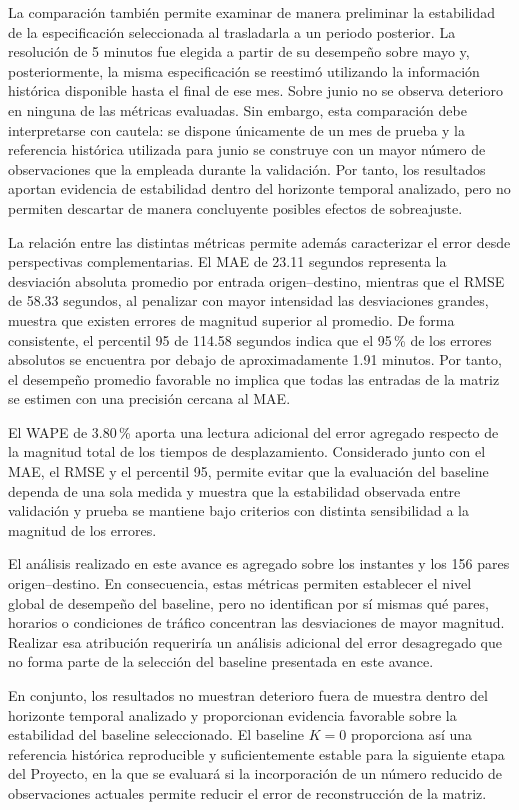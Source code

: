 \documentclass[11pt]{article}
\begin{document}
La comparación también permite examinar de manera preliminar la estabilidad de la especificación seleccionada al trasladarla a un periodo posterior. La resolución de 5 minutos fue elegida a partir de su desempeño sobre mayo y, posteriormente, la misma especificación se reestimó utilizando la información histórica disponible hasta el final de ese mes. Sobre junio no se observa deterioro en ninguna de las métricas evaluadas. Sin embargo, esta comparación debe interpretarse con cautela: se dispone únicamente de un mes de prueba y la referencia histórica utilizada para junio se construye con un mayor número de observaciones que la empleada durante la validación. Por tanto, los resultados aportan evidencia de estabilidad dentro del horizonte temporal analizado, pero no permiten descartar de manera concluyente posibles efectos de sobreajuste.

La relación entre las distintas métricas permite además caracterizar el error desde perspectivas complementarias. El MAE de 23.11 segundos representa la desviación absoluta promedio por entrada origen--destino, mientras que el RMSE de 58.33 segundos, al penalizar con mayor intensidad las desviaciones grandes, muestra que existen errores de magnitud superior al promedio. De forma consistente, el percentil 95 de 114.58 segundos indica que el 95\,\% de los errores absolutos se encuentra por debajo de aproximadamente 1.91 minutos. Por tanto, el desempeño promedio favorable no implica que todas las entradas de la matriz se estimen con una precisión cercana al MAE.

El WAPE de 3.80\,\% aporta una lectura adicional del error agregado respecto de la magnitud total de los tiempos de desplazamiento. Considerado junto con el MAE, el RMSE y el percentil 95, permite evitar que la evaluación del baseline dependa de una sola medida y muestra que la estabilidad observada entre validación y prueba se mantiene bajo criterios con distinta sensibilidad a la magnitud de los errores.

El análisis realizado en este avance es agregado sobre los instantes y los 156 pares origen--destino. En consecuencia, estas métricas permiten establecer el nivel global de desempeño del baseline, pero no identifican por sí mismas qué pares, horarios o condiciones de tráfico concentran las desviaciones de mayor magnitud. Realizar esa atribución requeriría un análisis adicional del error desagregado que no forma parte de la selección del baseline presentada en este avance.

En conjunto, los resultados no muestran deterioro fuera de muestra dentro del horizonte temporal analizado y proporcionan evidencia favorable sobre la estabilidad del baseline seleccionado. El baseline $K=0$ proporciona así una referencia histórica reproducible y suficientemente estable para la siguiente etapa del Proyecto, en la que se evaluará si la incorporación de un número reducido de observaciones actuales permite reducir el error de reconstrucción de la matriz.
\end{document}

